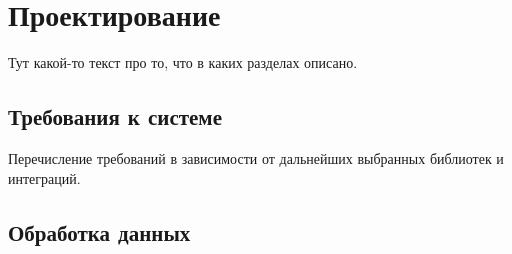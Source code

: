 \lstset{language=C, frame=L, basicstyle=\footnotesize,%
	keywordstyle=\bfseries, showstringspaces=false, xleftmargin=\parindent, numbers=none, numberstyle=\tiny, stepnumber=2, numbersep=14pt}
\newpage
\section{Проектирование}
\label{sec:Design}

Тут какой-то текст про то, что в каких разделах описано.

\subsection{Требования к системе}
\label{sec:Requirements}

Перечисление требований в зависимости от дальнейших выбранных библиотек и интеграций.

\subsection{Обработка данных}

